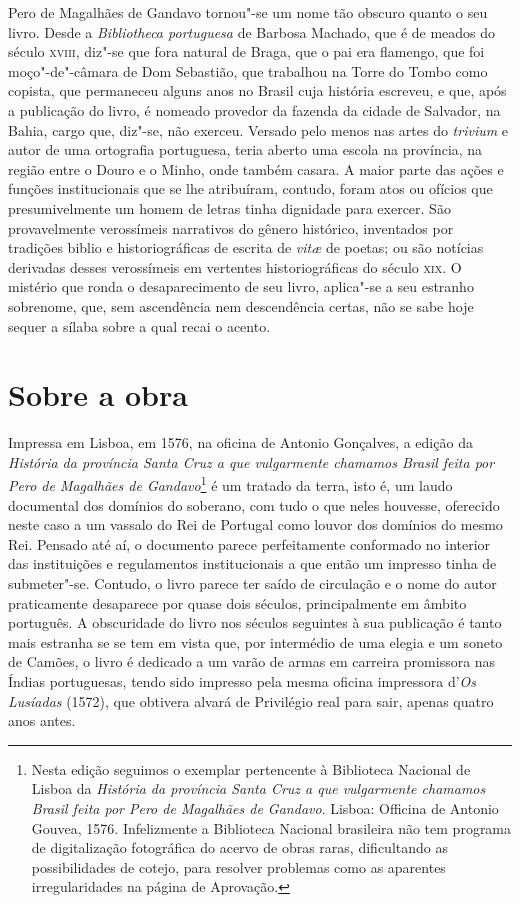 Pero de Magalhães de Gandavo  tornou"-se um nome tão obscuro quanto o seu
livro. Desde a \textit{Bibliotheca portuguesa} de Barbosa Machado, que é de
meados do século \textsc{xviii}, diz"-se que fora natural de Braga, que o pai era
flamengo, que foi moço"-de"-câmara de Dom Sebastião, que trabalhou na
Torre do Tombo como copista, que permaneceu alguns anos no Brasil cuja
história escreveu, e que, após a publicação do livro, é nomeado
provedor da fazenda da cidade de Salvador, na Bahia, cargo que, diz"-se,
não exerceu. Versado pelo menos nas artes do \textit{trivium} e autor de uma
ortografia portuguesa, teria aberto uma escola na província, na região
entre o Douro e o Minho, onde também casara. A maior parte das ações e
funções institucionais que se lhe atribuíram, contudo, foram atos ou
ofícios que presumivelmente um homem de letras tinha dignidade para
exercer. São provavelmente verossímeis narrativos do gênero histórico,
inventados por tradições biblio e historiográficas de escrita de \textit{vit\ae}
de poetas; ou são notícias derivadas desses verossímeis em vertentes
historiográficas do século \textsc{xix}. O mistério que ronda o desaparecimento
de seu livro, aplica"-se a seu estranho sobrenome, que, sem ascendência
nem descendência certas, não se sabe hoje sequer a sílaba sobre a qual recai o acento.



\section{Sobre a obra}

\noindent{}Impressa em Lisboa, em 1576, na oficina de Antonio Gonçalves, a edição
da \textit{História da província Santa Cruz a que vulgarmente chamamos Brasil
feita por Pero de Magalhães de Gandavo}\footnote{ Nesta edição
seguimos o exemplar pertencente à Biblioteca Nacional de Lisboa da
\textit{História da província Santa Cruz a que vulgarmente chamamos Brasil
feita por Pero de Magalhães de Gandavo}. Lisboa: Officina de Antonio
Gouvea, 1576. Infelizmente a Biblioteca Nacional brasileira não tem
programa de digitalização fotográfica do acervo de obras raras,
dificultando as possibilidades de cotejo, para resolver problemas como
as aparentes irregularidades na página de Aprovação.} é um tratado da terra, isto
é, um laudo documental dos domínios do soberano, com tudo o que neles
houvesse, oferecido neste caso a um vassalo do Rei de Portugal como
louvor dos domínios do mesmo Rei. Pensado até aí, o documento parece
perfeitamente conformado no interior das instituições e regulamentos
institucionais a que então um impresso tinha de submeter"-se. Contudo, o
livro parece ter saído de circulação e o nome do autor praticamente
desaparece por quase dois séculos, principalmente em âmbito português.
A obscuridade do livro nos séculos seguintes à sua publicação é tanto
mais estranha se se tem em vista que, por intermédio de uma elegia e um
soneto de Camões, o livro é dedicado a um varão de armas em carreira
promissora nas Índias portuguesas, tendo sido impresso pela mesma
oficina impressora d'\textit{Os Lusíadas} (1572), que obtivera
alvará de Privilégio real para sair, apenas quatro anos antes.

